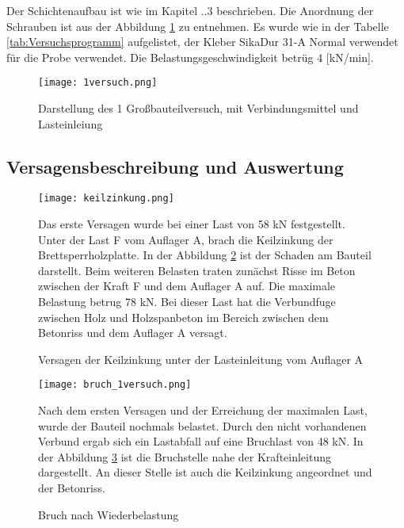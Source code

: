 \documentclass[12 pt,a4 paper ]{scrreprt}
\begin{document}
Der Schichtenaufbau ist wie im Kapitel ..3 beschrieben. Die Anordnung der Schrauben ist aus der Abbildung \ref{1versuch} zu entnehmen. Es wurde wie in der Tabelle \ref{tab:Versuchsprogramm}  aufgelistet, der Kleber SikaDur 31-A Normal verwendet für die Probe verwendet. Die Belastungsgeschwindigkeit betrüg 4 [kN/min]. 


\begin{figure}[h]
\begin{center}
\texttt{[image: 1versuch.png]}
\caption{Darstellung des 1 Großbauteilversuch, mit Verbindungsmittel und Lasteinleiung}
\label{1versuch}
\end{center}
\end{figure}

\subsection{Versagensbeschreibung und Auswertung}


\begin{figure}[h]
\begin{minipage}[hbt]{7cm}
	\texttt{[image: keilzinkung.png]}
	\caption{Versagen der Keilzinkung unter der Lasteinleitung vom Auflager A }
	\label{keilzinkung}
\end{minipage}
\hfill
\begin{minipage}[hbt]{8cm}
Das erste Versagen wurde bei einer Last von 58 kN festgestellt. Unter der Last F vom Auflager A, brach die Keilzinkung der Brettsperrholzplatte. In der Abbildung \ref{keilzinkung} ist der Schaden am Bauteil darstellt.
Beim weiteren Belasten traten zunächst Risse im Beton zwischen der Kraft F und dem Auflager A auf. Die maximale Belastung betrug 78 kN. Bei dieser Last hat die Verbundfuge zwischen Holz und Holzspanbeton im Bereich zwischen dem Betonriss und dem Auflager A versagt.
\end{minipage}
\end{figure}


\begin{figure}[h]
\begin{minipage}[hbt]{7cm}
	\texttt{[image: bruch\_1versuch.png]}
	\caption{Bruch nach Wiederbelastung }
	\label{1bruch}
\end{minipage}
\hfill
\begin{minipage}[hbt]{7cm}
Nach dem ersten Versagen und der Erreichung der maximalen Last, wurde der Bauteil  nochmals belastet. Durch den nicht vorhandenen Verbund ergab sich ein Lastabfall auf eine Bruchlast von 48 kN. In der Abbildung \ref{1bruch} ist die Bruchstelle nahe der Krafteinleitung dargestellt. An dieser Stelle ist auch die Keilzinkung angeordnet und der Betonriss.
\end{minipage}
\end{figure}
\end{document}
